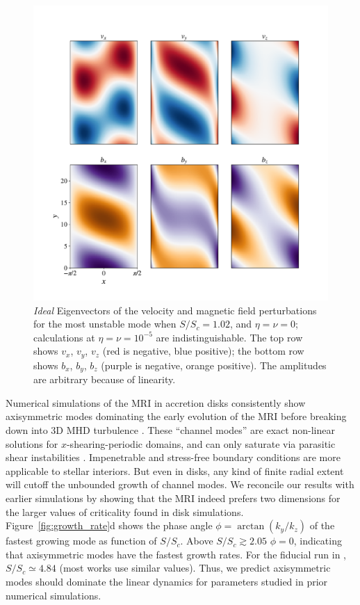 \documentclass[aps,prl,reprint,superscriptaddress]{revtex4-1}
\newcommand{\SSC}{S/S_{c}}
\begin{document}
\begin{figure}[h!]
  \centering
  \includegraphics[width=\columnwidth]{eigvecs_xy_run_11_ideal_single_mode.pdf}
  \caption{\textit{Ideal} Eigenvectors of the velocity and magnetic field perturbations for the most unstable mode when $\SSC=1.02$, and $\eta=\nu=0$; calculations at $\eta=\nu=10^{-5}$ are indistinguishable.
  The top row shows $v_{x}$, $v_{y}$, $v_{z}$ (red is negative, blue positive); the bottom row shows $b_{x}$, $b_{y}$, $b_{z}$ (purple is negative, orange positive). 
The amplitudes are arbitrary because of linearity.}
  \label{fig:eigvec}
\end{figure}

Numerical simulations of the MRI in accretion disks consistently show axisymmetric modes dominating the early evolution of the MRI before breaking down into 3D MHD turbulence \citep{1995ApJ...440..742H,2018ApJ...853..174H,2019ApJS..241...26D}. 
These ``channel modes'' are exact non-linear solutions for $x$-shearing-periodic domains, and can only saturate via parasitic shear instabilities \citep{1994ApJ...432..213G}.
Impenetrable and stress-free boundary conditions are more applicable to stellar interiors. 
But even in disks, any kind of finite radial extent will cutoff the unbounded growth of channel modes. 
We reconcile our results with earlier simulations by showing that the MRI indeed prefers two dimensions for the larger values of criticality found in disk simulations. 
Figure~\ref{fig:growth_rate}d shows the phase angle $\phi=\arctan(k_{y}/k_{z})$ of the fastest growing mode as function of $\SSC$.
Above $\SSC\gtrsim2.05$ $\phi=0$, indicating that axisymmetric modes have the fastest growth rates.
For the fiducial run in \citet{1996ApJ...464..690H}, $\SSC\simeq4.84$ (most works use similar values).
Thus, we predict axisymmetric modes should dominate the linear dynamics for parameters studied in prior numerical simulations.
\end{document}
